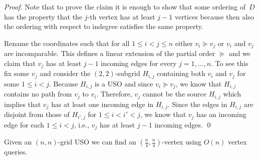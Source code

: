 \documentclass[runningheads,a4paper]{llncs}
\newcommand{\JN}[1]{\marginpar{\parbox{3.6cm}{{\small {\bf JN:} #1}}}} %
\begin{document}
\begin{proof}
Note that to prove the claim it is enough to show that some ordering of~$D$ has the property that the $j$-th vertex has at least $j-1$ vertices because then also the ordering with respect to indegree satisfies the same property. 

Rename the coordinates such that for all $1 \leq i < j\leq n$ either $v_i \succeq v_j$ or $v_i$ and $v_j$ are incomparable. 
This defines a linear extension of the partial order $\succeq$ and we claim that $v_j$ has at least $j-1$ incoming edges for every $j = 1, \ldots, n$. 
To see this fix some $v_j$ and consider the $(2,2)$-subgrid $H_{i,j}$ containing both $v_i$ and $v_j$ for some $1\leq i < j$. 
Because $H_{i,j}$ is a USO and since $v_i \succeq v_j$, we know that $H_{i,j}$ contains no path from $v_j$ to $v_i$. 
Therefore, $v_j$ cannot be the source $H_{i,j}$  which implies that $v_j$ has at least one incoming edge in $H_{i,j}$. 
Since the edges in $H_{i,j}$ are disjoint from those of $H_{i',j}$ for $1\leq i < i' < j$, 
we know that $v_j$ has an incoming edge for each $1\leq i< j$, i.e., $v_j$ has at least $j-1$ incoming edges. 
 \qed
\end{proof}



\begin{lemma}
\label{lem:seed_lemma_for_square_matrices}
 Given an $(n, n)$-grid USO we can find an $(\frac{n}{4}, \frac{n}{4})$-vertex using $O(n)$ vertex queries.
\end{lemma}
\end{document}
